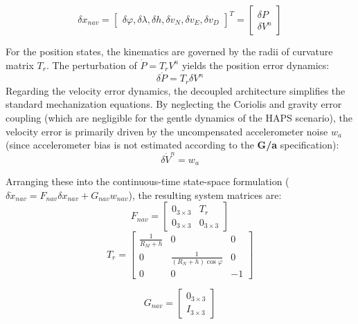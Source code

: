 \documentclass[a4paper,twoside,openany]{report}
\begin{document}
\begin{equation}
    \delta x_{nav} = \begin{bmatrix} \delta\varphi, \delta\lambda, \delta h, \delta v_N, \delta v_E, \delta v_D \end{bmatrix}^T = \begin{bmatrix} \delta P \\ \delta V^n \end{bmatrix}
\end{equation}

For the position states, the kinematics are governed by the radii of curvature matrix $T_r$. The perturbation of $\dot{P} = T_r V^n$ yields the position error dynamics:
\begin{equation}
    \delta\dot{P} = T_r \delta V^n
\end{equation}
Regarding the velocity error dynamics, the decoupled architecture simplifies the standard mechanization equations. By neglecting the Coriolis and gravity error coupling (which are negligible for the gentle dynamics of the HAPS scenario), the velocity error is primarily driven by the uncompensated accelerometer noise $w_a$ (since accelerometer bias is not estimated according to the \textbf{G/a} specification):
\begin{equation}
    \delta\dot{V}^n = w_a
\end{equation}

Arranging these into the continuous-time state-space formulation ($\delta\dot{x}_{nav} = F_{nav} \delta x_{nav} + G_{nav} w_{nav}$), the resulting system matrices are:
\begin{equation}
    F_{nav} = \begin{bmatrix} 0_{3\times3} & T_r \\ 0_{3\times3} & 0_{3\times3} \end{bmatrix}
\end{equation}
\begin{equation}
    T_r = \begin{bmatrix} \frac{1}{R_M+h} & 0 & 0 \\ 0 & \frac{1}{(R_N+h)\cos\varphi} & 0 \\ 0 & 0 & -1 \end{bmatrix}
\end{equation}

\begin{equation}
    G_{nav} = \begin{bmatrix} 0_{3\times3} \\ I_{3\times3} \end{bmatrix}
\end{equation}
\end{document}
